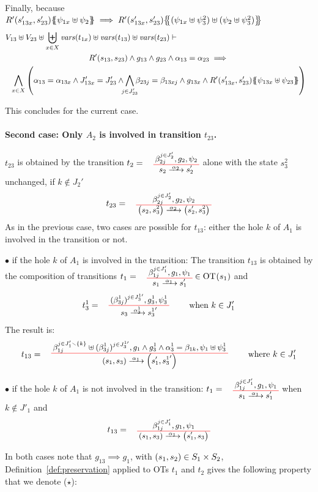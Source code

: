 \documentclass[runningheads]{llncs}
\begin{document}
\begin{enumerate}
 
Finally, because $R'\mpar{s'_{1 3x}, s'_{23}}\psubst{\psi_{1 x} \uplus \psi_2} \implies R'\mpar{s'_{1 3x}, s'_{23}}\psubst{(\psi_{1 x} \uplus \psi^2_3) \uplus (\psi_2 \uplus \psi^2_3)}$
\begin{multline*}
  V_{13} \uplus V_{23} \uplus  \biguplus_{x\in X}\fvars{t_{1x}}  \uplus \fvars{t_{13}} \uplus \fvars{t_{23}} 
\vdash \hspace{6cm}\\  R'\mpar{s_{13}, s_{23}} \wedge 	g_{13} \wedge g_{23} \wedge \alpha_{13} = \alpha_{23} 
\implies \\
\bigwedge_{x\in X}
\mpar{
 \alpha_{13}=\alpha_{1 3x} \land
J'_{13x}  = J'_{23}  \land \bigwedge_\subbox{j \in  J'_{23}} \beta_{23j} = \beta_{13xj}\land g_{1 3x} \land
 R'\mpar{s'_{1 3x}, s'_{23}}\psubst{\psi_{1 3x} \uplus \psi_{23}}}
\end{multline*}

This concludes for the current case.

\paragraph{Second case: Only $A_2$ is involved in transition $t_{23}$.}
$t_{23}$ is obtained  by  the transition $t_2=\OTx{2}{}{2}{2}$ alone with the state $s^2_3$ unchanged, if $k \not\in J_2'$
\[t_{23} = \OT{\mpar{s_2, s^2_3}}{\mpar{s'_2, s^2_3}}{\alpha_2}{\beta_{2j}^{j \in J'_2}}{g_2}{\psi_2}
\]
As in the previous case, two cases are possible for $t_{13}$: either the hole $k$ of $A_1$ is involved in the transition or not.

$\bullet$ if  the hole $k$ of $A_1$ is involved in the transition: 
The transition $t_{13}$ is obtained by the composition of  transitions $t_1=\OTx{1}{}{1}{1}\in\fOT{s_1}$ and  \[t_3^1=
\OT{ s_3}{{s^1_3}'}{\alpha_3^1}{   {(\beta^1_{3j})^{j \in J^{1 \prime}_3} }}{ g^1_3 }{ \psi^1_3} \qquad \text{ when } k \in J'_{1} 
\] The result is:
\[
t_{13} = \OT{\mpar{s_1, s_3}}{\mpar{s'_1, {s^1_3}'}}{\alpha_1}{\beta_{1j}^{j \in J'_1 \setminus \{k\}} \uplus  {(\beta^1_{3j})^{j \in J^{1 \prime}_3} }}{g_1 \wedge g^1_3 \wedge \alpha^1_3 = \beta_{1k}}{\psi_1 \uplus \psi^1_3} \qquad \text{ where } k \in J'_{1} 
\]

$\bullet$ if  the hole $k$ of $A_1$ is not involved in the transition:
$t_1=\OTx{1}{}{1}{1}$ when  $k \not\in J'_{1} $
and 
\[
t_{13} = \OT{\mpar{s_1, s_3}}{\mpar{s'_1, {s_3}}}{\alpha_1}{\beta_{1j}^{j \in J'_1}}{g_1}{\psi_1}
\]

In both cases note that $g_{13} \implies g_1$, with  ${\left(s_1, s_2\right)} \in S_1 \times S_2$, Definition~\ref{def:preservation} applied to OTs $t_1$ and $t_2$ gives the following property that we denote ($\star$):


\end{enumerate}
\end{document}
